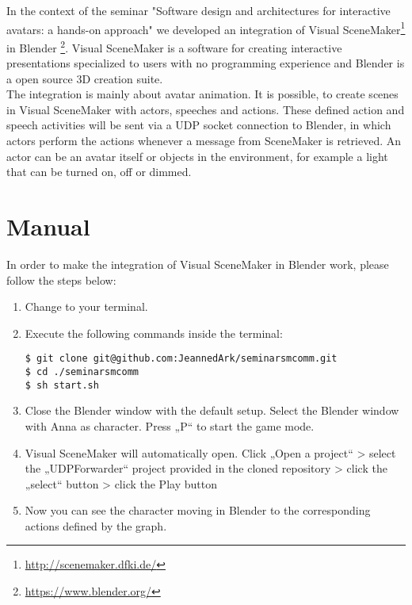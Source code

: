 \documentclass[
10pt, %
a4paper, %
oneside,
headinclude,footinclude, %
BCOR5mm, %
]{scrartcl}
\begin{document}
In the context of the seminar "Software design and architectures for interactive avatars: a hands-on approach" we developed an integration of Visual SceneMaker\footnote{\url{http://scenemaker.dfki.de/}} in Blender \footnote{\url{https://www.blender.org/}}.
Visual SceneMaker is a software for creating interactive presentations specialized to users with no programming experience and Blender is a open source 3D creation suite.\\
The integration is mainly about avatar animation. It is possible, to create scenes in Visual SceneMaker with actors, speeches and actions. These defined action and speech activities will be sent via a UDP socket connection to Blender, in which actors perform the actions whenever a message from SceneMaker is retrieved. An actor can be an avatar itself or objects in the environment, for example a light that can be turned on, off or dimmed.

\section{Manual}
In order to make the integration of Visual SceneMaker in Blender work, please follow the steps below:
\begin{enumerate}[noitemsep] %
\item Change to your terminal.
\item Execute the following commands inside the terminal:
\begin{lstlisting}
$ git clone git@github.com:JeannedArk/seminarsmcomm.git
$ cd ./seminarsmcomm
$ sh start.sh
\end{lstlisting}
\item Close the Blender window with the default setup. Select the Blender window with Anna as character. Press „P“ to start the game mode.
\item Visual SceneMaker will automatically open. Click „Open a project“ > select the „UDPForwarder“ project provided in the cloned repository > click the „select“ button > click the Play button
\item Now you can see the character moving in Blender to the corresponding actions defined by the graph.
\end{enumerate}

\end{document}

